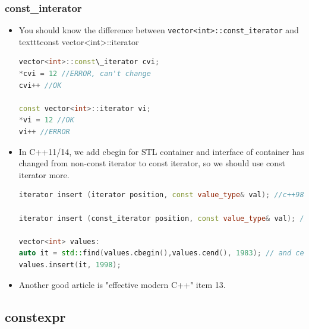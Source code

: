 \documentclass[a4paper,12pt,twoside]{book}
\begin{document}
\subsubsection{const\_interator}
\begin{itemize}
	\item You should know the difference between \texttt{vector<int>::const\_iterator} and texttt{const vector<int>::iterator}
\begin{lstlisting}[frame=single, language=c++]
vector<int>::const\_iterator cvi;
*cvi = 12 //ERROR, can't change
cvi++ //OK

const vector<int>::iterator vi;
*vi = 12 //OK
vi++ //ERROR
\end{lstlisting}

	\item In C++11/14, we add cbegin for STL container and interface of container has changed from non-const iterator to const iterator, so we should use const iterator more. 
\begin{lstlisting}[frame=single, language=c++]
iterator insert (iterator position, const value_type& val); //c++98

iterator insert (const_iterator position, const value_type& val); //c++11

vector<int> values:
auto it = std::find(values.cbegin(),values.cend(), 1983); // and cend
values.insert(it, 1998);
\end{lstlisting}
	
	
	\item Another good article is "effective modern C++" item 13. 
\end{itemize}

\subsection{constexpr}
\end{document}
